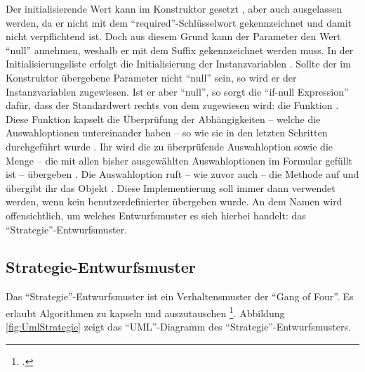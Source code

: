 Der initialisierende Wert kann im Konstruktor gesetzt ,
aber auch ausgelassen werden,
da er nicht mit dem \enquote{required}-Schlüsselwort gekennzeichnet und damit nicht verpflichtend ist.
Doch aus diesem Grund kann der Parameter den Wert \enquote{null} annehmen,
weshalb er mit dem Suffix  gekennzeichnet werden muss.
In der Initialisierungsliste erfolgt die Initialisierung der Instanzvariablen  .
Sollte der im Konstruktor übergebene Parameter nicht \enquote{null} sein,
so wird er der Instanzvariablen zugewiesen.
Ist er aber \enquote{null},
so sorgt die \enquote{if-null Expression} dafür,
dass der Standardwert rechts von dem  zugewiesen wird:
die Funktion .
Diese Funktion kapselt die Überprüfung der Abhängigkeiten
-- welche die Auswahloptionen  untereinander haben --
so wie sie in den letzten Schritten durchgeführt wurde .
Ihr wird die zu überprüfende Auswahloption 
sowie die Menge  -- die mit allen bisher ausgewählten Auswahloptionen im Formular gefüllt ist --
übergeben .
Die Auswahloption  ruft
-- wie zuvor auch --
die Methode  auf
und übergibt ihr das Objekt  .
Diese Implementierung soll immer dann verwendet werden, 
wenn kein benutzerdefinierter  übergeben wurde.
An dem Namen  wird offensichtlich, um welches Entwurfsmuster es sich hierbei handelt: das \enquote{Strategie}-Entwurfsmuster. 

\clearpage
\subsection{Strategie-Entwurfsmuster}

Das \enquote{Strategie}-Entwurfsmuster ist ein Verhaltensmuster der \enquote{Gang of Four}.
Es erlaubt Algorithmen zu kapseln und auszutauschen \footcite[Vgl.][S. 373]{gamma2009entwurfsmuster}.
Abbildung \ref{fig:UmlStrategie} zeigt das \enquote{UML}-Diagramm des \enquote{Strategie}-Entwurfsmusters. 


